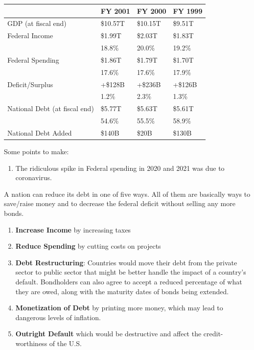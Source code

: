 \documentclass{article}
\begin{document}
    \begin{table}[H]
      \begin{tabular}{|l|l|l|l|}
      \hline
      & FY 2001 & FY 2000 & FY 1999 \\ \hline
      GDP (at fiscal end) & \$10.57T & \$10.15T & \$9.51T \\ \hline
      Federal Income & \$1.99T & \$2.03T & \$1.83T \\
      & 18.8\% & 20.0\% & 19.2\% \\ \hline
      Federal Spending & \$1.86T & \$1.79T & \$1.70T \\
      & 17.6\% & 17.6\% & 17.9\% \\ \hline
      Deficit/Surplus & +\$128B & +\$236B & +\$126B \\
      & 1.2\% & 2.3\% & 1.3\% \\ \hline
      National Debt (at fiscal end) & \$5.77T & \$5.63T & \$5.61T \\
      & 54.6\% & 55.5\% & 58.9\% \\ \hline
      National Debt Added & \$140B & \$20B & \$130B \\ \hline
      \end{tabular}
    \end{table}

    Some points to make:

    \begin{enumerate}
    \item The ridiculous spike in Federal spending in 2020 and 2021 was due to coronavirus.
    \end{enumerate}

    A nation can reduce its debt in one of five ways. All of them are basically ways to save/raise money and to decrease the federal deficit without selling any more bonds.
    \begin{enumerate}
      \item \textbf{Increase Income} by increasing taxes
      \item \textbf{Reduce Spending} by cutting costs on projects
      \item \textbf{Debt Restructuring}: Countries would move their debt from the private sector to public sector that might be better handle the impact of a country's default. Bondholders can also agree to accept a reduced percentage of what they are owed, along with the maturity dates of bonds being extended.
      \item \textbf{Monetization of Debt} by printing more money, which may lead to dangerous levels of inflation.
      \item \textbf{Outright Default} which would be destructive and affect the credit-worthiness of the U.S.
    \end{enumerate}
\end{document}

